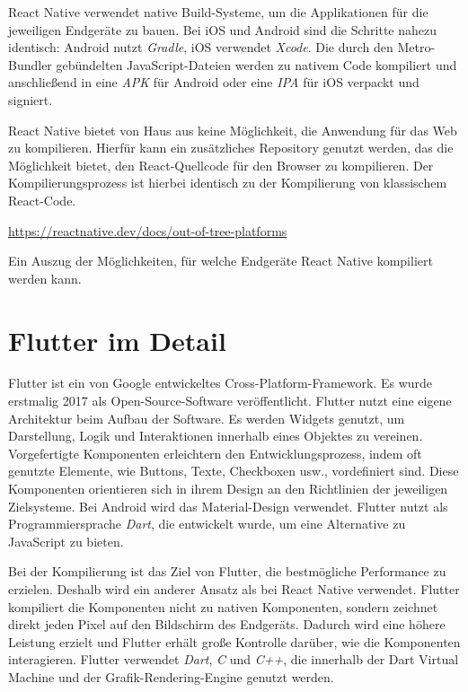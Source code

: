 \documentclass[a4paper,12pt]{article}
\begin{document}
React Native verwendet native Build-Systeme, um die Applikationen für die jeweiligen Endgeräte zu bauen. Bei iOS und Android sind die Schritte nahezu identisch: Android nutzt \textit{Gradle}, iOS verwendet \textit{Xcode}. Die durch den Metro-Bundler gebündelten JavaScript-Dateien werden zu nativem Code kompiliert und anschließend in eine \textit{APK} für Android oder eine \textit{IPA} für iOS verpackt und signiert.

\vspace{0.5cm}

React Native bietet von Haus aus keine Möglichkeit, die Anwendung für das Web zu kompilieren. Hierfür kann ein zusätzliches Repository genutzt werden, das die Möglichkeit bietet, den React-Quellcode für den Browser zu kompilieren. Der Kompilierungsprozess ist hierbei identisch zu der Kompilierung von klassischem React-Code.

\vspace{0.5cm}

\begin{center}
    \url{https://reactnative.dev/docs/out-of-tree-platforms}
\end{center}

Ein Auszug der Möglichkeiten, für welche Endgeräte React Native kompiliert werden kann.

\section{Flutter im Detail}
Flutter ist ein von Google entwickeltes Cross-Platform-Framework. Es wurde erstmalig 2017 als Open-Source-Software veröffentlicht. Flutter nutzt eine eigene Architektur beim Aufbau der Software. Es werden Widgets genutzt, um Darstellung, Logik und Interaktionen innerhalb eines Objektes zu vereinen. Vorgefertigte Komponenten erleichtern den Entwicklungsprozess, indem oft genutzte Elemente, wie Buttons, Texte, Checkboxen usw., vordefiniert sind. Diese Komponenten orientieren sich in ihrem Design an den Richtlinien der jeweiligen Zielsysteme. Bei Android wird das Material-Design verwendet. Flutter nutzt als Programmiersprache \textit{Dart}, die entwickelt wurde, um eine Alternative zu JavaScript zu bieten.

\vspace{0.5cm}

Bei der Kompilierung ist das Ziel von Flutter, die bestmögliche Performance zu erzielen. Deshalb wird ein anderer Ansatz als bei React Native verwendet. Flutter kompiliert die Komponenten nicht zu nativen Komponenten, sondern zeichnet direkt jeden Pixel auf den Bildschirm des Endgeräts. Dadurch wird eine höhere Leistung erzielt und Flutter erhält große Kontrolle darüber, wie die Komponenten interagieren. Flutter verwendet \textit{Dart}, \textit{C} und \textit{C++}, die innerhalb der Dart Virtual Machine und der Grafik-Rendering-Engine genutzt werden.
\end{document}
